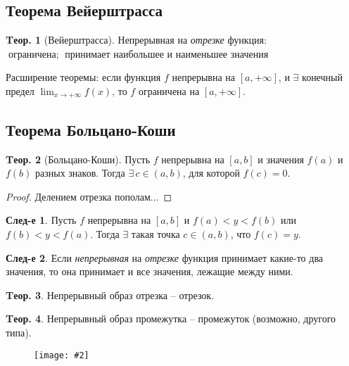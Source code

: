 \documentclass[a4paper,12pt]{article}
\numberwithin{figure}{section}
\theoremstyle{definition}
\theoremstyle{definition}
\newtheorem{theorem}{Tеор.}[section]
\newtheorem*{corollary}{След-е} %
\def\DS{\displaystyle}
\def\circleone{\ding{192}$\;$}
\def\circletwo{\ding{193}$\;$}
\newcommand\CenterFigure[2]{
	\begin{figure}[H]
		\centering
		\texttt{[image: \#2]}
	\end{figure}
}
\begin{document}
\subsection{Теорема Вейерштрасса}

\begin{theorem}[Вейерштрасса]
  Непрерывная на \textit{отрезке} функция: \\
	\circleone ограничена;
	\circletwo принимает наибольшее и наименьшее значения
\end{theorem}

\bigbreak
Расширение теоремы: если функция $f$ непрерывна на $[a,+\infty]$,
и $\exists$ конечный предел $\DS \lim_{x\to+\infty}f(x)$,
то $f$ ограничена на $[a,+\infty]$.


\subsection{Теорема Больцано-Коши}

\begin{theorem}[Больцано-Коши]
	Пусть $f$ непрерывна на $[a,b]$ и значения $f(a)$ и $f(b)$ разных знаков.
	Тогда $\exists \, c \in (a,b)$, для которой $f(c)=0$.
\end{theorem}
\begin{proof}
	Делением отрезка пополам...
\end{proof}

\begin{corollary}
	Пусть $f$ непрерывна на $[a,b]$ и $f(a)<y<f(b)$ или $f(b)<y<f(a)$.
	Тогда $\exists$ такая точка $c\in(a,b)$, что $f(c)=y$.
\end{corollary}

\begin{corollary}
	Если \textit{непрерывная} на \textit{отрезке} функция принимает какие-то два значения,
	то она принимает и все значения, лежащие между ними.
\end{corollary}

\begin{theorem}	Непрерывный образ отрезка -- отрезок. \end{theorem}

\begin{theorem}
	Непрерывный образ промежутка -- промежуток (возможно, другого типа).
\end{theorem}

\CenterFigure{\linewidth}{bolcano-koshi-test-1.png}
\end{document}
